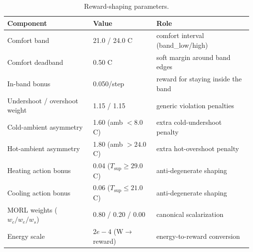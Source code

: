 \documentclass[11pt,a4paper]{article}
\begin{document}
\begin{table}[H]
\centering
\caption{Reward-shaping parameters.}
\label{tab:reward}
\small
\begin{tabularx}{\linewidth}{llX}
\toprule
Component & Value & Role \\
\midrule
Comfort band & 21.0 / 24.0 C & comfort interval (band\_low/high) \\
Comfort deadband & 0.50 C & soft margin around band edges \\
In-band bonus & 0.050/step & reward for staying inside the band \\
Undershoot / overshoot weight & 1.15 / 1.15 & generic violation penalties \\
Cold-ambient asymmetry & 1.60 (amb $<8.0$ C) & extra cold-undershoot penalty \\
Hot-ambient asymmetry & 1.80 (amb $>24.0$ C) & extra hot-overshoot penalty \\
Heating action bonus & 0.04 ($T_{\mathrm{sup}}\ge 29.0$ C) & anti-degenerate shaping \\
Cooling action bonus & 0.06 ($T_{\mathrm{sup}}\le 21.0$ C) & anti-degenerate shaping \\
MORL weights ($w_c/w_e/w_s$) & 0.80 / 0.20 / 0.00 & canonical scalarization \\
Energy scale & $2e-4$ (W$\to$reward) & energy-to-reward conversion \\
\bottomrule
\end{tabularx}
\end{table}
\end{document}
